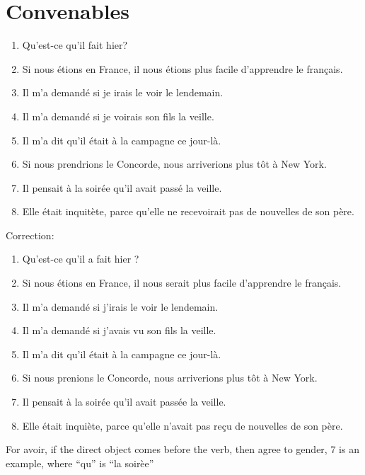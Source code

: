 \documentclass{book}
\begin{document}
    \section{Convenables}
        \begin{enumerate}
            \item Qu'est-ce qu'il fait hier?
            \item Si nous étions en France, il nous étions plus facile d'apprendre le français. 
            \item Il m'a demandé si je irais le voir le lendemain.
            \item Il m'a demandé si je voirais son fils la veille.
            \item Il m'a dit qu'il était à la campagne ce jour-là.
            \item Si nous prendrions le Concorde, nous arriverions plus tôt à New York.
            \item Il pensait à la soirée qu'il avait passé la veille.
            \item Elle était inquitète, parce qu'elle ne recevoirait pas de nouvelles de son père.
        \end{enumerate}
        Correction:
        \begin{enumerate}
            \item Qu'est-ce qu'il a fait hier ?
            \item Si nous étions en France, il nous serait plus facile d'apprendre le français.
            \item Il m'a demandé si j'irais le voir le lendemain.
            \item Il m'a demandé si j'avais vu son fils la veille.
            \item Il m'a dit qu'il était à la campagne ce jour-là.
            \item Si nous prenions le Concorde, nous arriverions plus tôt à New York.
            \item Il pensait à la soirée qu'il avait passée la veille.
            \item Elle était inquiète, parce qu'elle n'avait pas reçu de nouvelles de son père.
        \end{enumerate}
        For avoir, if the direct object comes before the verb, then agree to gender, 7 is an example, where ``qu'' is ``la soirèe''
\end{document}
